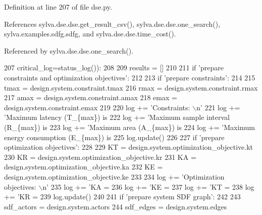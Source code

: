 Definition at line 207 of file dse.\+py.



References sylva.\+dse.\+dse.\+get\+\_\+result\+\_\+csv(), sylva.\+dse.\+dse.\+one\+\_\+search(), sylva.\+examples.\+sdfg.\+sdfg, and sylva.\+dse.\+dse.\+time\+\_\+cost().



Referenced by sylva.\+dse.\+dse.\+one\+\_\+search().


\begin{DoxyCode}
207                critical\_log=status\_log()):
208 
209     results = []
210 
211     \textcolor{keywordflow}{if} \textcolor{stringliteral}{'prepare constraints and optimization objectives'}:
212 
213         \textcolor{keywordflow}{if} \textcolor{stringliteral}{'prepare constraints'}:
214 
215             tmax = design.system.constraint.tmax
216             rmax = design.system.constraint.rmax
217             amax = design.system.constraint.amax
218             emax = design.system.constraint.emax
219 
220             log += \textcolor{stringliteral}{'Constraints: \(\backslash\)n'}
221             log += \textcolor{stringliteral}{'Maximum latency (T\_\{max\}) is %
222             log += \textcolor{stringliteral}{'Maximum sample interval (R\_\{max\}) is %
223             log += \textcolor{stringliteral}{'Maximum area (A\_\{max\}) is %
224             log += \textcolor{stringliteral}{'Maximum energy consumption (E\_\{max\}) is %
225             log.update()
226 
227         \textcolor{keywordflow}{if} \textcolor{stringliteral}{'prepare optimization objectives'}:
228 
229             KT = design.system.optimization\_objective.kt
230             KR = design.system.optimization\_objective.kr
231             KA = design.system.optimization\_objective.ka
232             KE = design.system.optimization\_objective.ke
233 
234             log += \textcolor{stringliteral}{'Optimization objectives: \(\backslash\)n'}
235             log += \textcolor{stringliteral}{'KA = %
236             log += \textcolor{stringliteral}{'KE = %
237             log += \textcolor{stringliteral}{'KT = %
238             log += \textcolor{stringliteral}{'KR = %
239             log.update()
240 
241     \textcolor{keywordflow}{if} \textcolor{stringliteral}{'prepare system SDF graph'}:
242 
243         sdf\_actors = design.system.actors
244         sdf\_edges = design.system.edges
}}}}}}}}
\end{DoxyCode}
